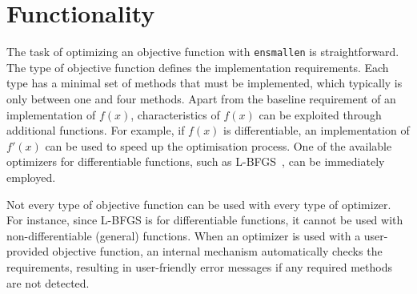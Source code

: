 \documentclass[twoside,11pt]{article}
\begin{document}

\section{Functionality}

The task of optimizing an objective function with {\tt ensmallen} is straightforward.
The type of objective function defines the implementation requirements.
Each type has a minimal set of methods that must be implemented,
which typically is only between one and four methods.
Apart from the baseline requirement of an implementation of $f(x)$,
characteristics of $f(x)$ can be exploited through additional functions.
For example, if $f(x)$ is differentiable,
an implementation of $f'(x)$ can be used to speed up the optimisation process.
One of the available optimizers for differentiable functions,
such as L-BFGS~\citep{liu1989limited},
can be immediately employed.

Not every type of objective function can be used with every type of optimizer.
For instance, since L-BFGS is for differentiable functions,
it cannot be used with non-differentiable (general) functions.
When an optimizer is used with a user-provided objective function,
an internal mechanism automatically checks the requirements,
resulting in user-friendly error messages if any required methods are not detected.
\end{document}
